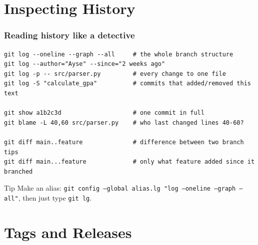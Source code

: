 \documentclass[aspectratio=169,10pt,compress]{beamer}
\newcommand{\cmd}[1]{\texttt{\color{gitred}#1}}
\begin{document}
\section[History]{Inspecting History}

\begin{frame}[t,fragile] \frametitle{Reading history like a detective}
\begin{lstlisting}
git log --oneline --graph --all     # the whole branch structure
git log --author="Ayse" --since="2 weeks ago"
git log -p -- src/parser.py         # every change to one file
git log -S "calculate_gpa"          # commits that added/removed this text

git show a1b2c3d                    # one commit in full
git blame -L 40,60 src/parser.py    # who last changed lines 40-60?

git diff main..feature              # difference between two branch tips
git diff main...feature             # only what feature added since it branched
\end{lstlisting}

  \begin{block}{Tip}
    Make an alias: \cmd{git config --global alias.lg "log --oneline --graph --all"},
    then just type \cmd{git lg}.
  \end{block}
\end{frame}

\section[Tags]{Tags and Releases}
\end{document}
